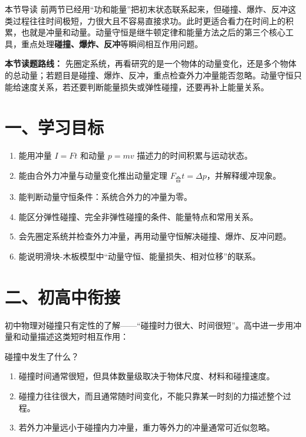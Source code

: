 
\begin{learningbox}{本节导读}
前两节已经用“功和能量”把初末状态联系起来，但碰撞、爆炸、反冲这类过程往往时间极短，力很大且不容易直接求功。此时更适合看力在时间上的积累，也就是冲量和动量。动量守恒是继牛顿定律和能量方法之后的第三个核心工具，重点处理\textbf{碰撞、爆炸、反冲}等瞬间相互作用问题。
\end{learningbox}

\textbf{本节读题路线：} 先圈定系统，再看研究的是一个物体的动量变化，还是多个物体的总动量；若题目是碰撞、爆炸、反冲，重点检查外力冲量能否忽略。动量守恒只能给速度关系，若还要判断能量损失或弹性碰撞，还要再补上能量关系。

\section*{一、学习目标}

\begin{enumerate}
  \item 能用冲量 $I = Ft$ 和动量 $p = mv$ 描述力的时间积累与运动状态。
  \item 能由合外力冲量与动量变化推出动量定理 $F_{\text{合}}t = \Delta p$，并解释缓冲现象。
  \item 能判断动量守恒条件：系统合外力的冲量为零。
  \item 能区分弹性碰撞、完全非弹性碰撞的条件、能量特点和常用关系。
  \item 会先圈定系统并检查外力冲量，再用动量守恒解决碰撞、爆炸、反冲问题。
  \item 能说明滑块-木板模型中“动量守恒、能量损失、相对位移”的联系。
\end{enumerate}
\section*{二、初高中衔接}

初中物理对碰撞只有定性的了解——“碰撞时力很大、时间很短”。高中进一步用冲量和动量描述这类短时相互作用：

碰撞中发生了什么？
\begin{enumerate}
  \item 碰撞时间通常很短，但具体数量级取决于物体尺度、材料和碰撞速度。
  \item 碰撞力往往很大，而且通常随时间变化，不能只靠某一时刻的力描述整个过程。
  \item 若外力冲量远小于碰撞内力冲量，重力等外力的冲量通常可近似忽略。
\end{enumerate}

